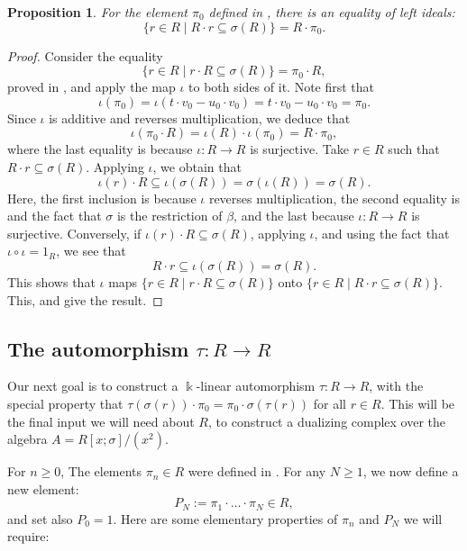 \documentclass{amsart}
\newtheorem{prop}[equation]{Proposition}
\theoremstyle{definition}
\renewcommand{\k}{\Bbbk}
\numberwithin{equation}{section}
\begin{document}
\begin{prop}\label{prop:rightcondComp}
For the element $\pi_0$ defined in ,
there is an equality of left ideals:
\[
\{r \in R \mid R\cdot r \subseteq \sigma(R)\} = R \cdot \pi_0.
\]
\end{prop}
\begin{proof}
Consider the equality
\begin{equation}\label{eqn:leftcondeq}
\{r \in R \mid r\cdot R \subseteq \sigma(R)\} = \pi_0 \cdot R,
\end{equation}
proved in ,
and apply the map $\iota$ to both sides of it.
Note first that 
\[
\iota(\pi_0) = \iota(t\cdot v_0 -u_0\cdot v_0) = 
t\cdot v_0 - u_0 \cdot v_0 = \pi_0.
\]
Since $\iota$ is additive and reverses multiplication,
we deduce that 
\begin{equation}\label{eqn:iotapileftright}
\iota(\pi_0 \cdot R) = \iota(R) \cdot \iota(\pi_0) = R\cdot \pi_0,
\end{equation}
where the last equality is because $\iota:R \to R$ is surjective.
Take $r \in R$ such that $R\cdot r \subseteq \sigma(R)$.
Applying $\iota$, we obtain that
\[
\iota(r) \cdot R \subseteq \iota(\sigma(R)) = \sigma(\iota(R)) = \sigma(R).
\]
Here, the first inclusion is because $\iota$ reverses multiplication,
the second equality is  and the fact that $\sigma$ is the restriction of $\beta$, and the last because $\iota:R \to R$ is surjective.
Conversely, if $\iota(r)\cdot R \subseteq \sigma(R)$,
applying $\iota$, and using the fact that $\iota\circ \iota = 1_R$,
we see that 
\[
R\cdot r \subseteq \iota(\sigma(R)) = \sigma(R).
\]
This shows that $\iota$ maps $\{r \in R \mid r\cdot R \subseteq \sigma(R)\}$ onto $\{r \in R \mid R\cdot r \subseteq \sigma(R)\}$. 
This,  and  give the result.
\end{proof}

\subsection{The automorphism $\tau:R \to R$}

Our next goal is to construct a $\k$-linear automorphism $\tau:R\to R$,
with the special property that $\tau(\sigma(r)) \cdot \pi_0 = \pi_0 \cdot \sigma(\tau(r))$ for all $r \in R$. This will be the final input we will need about $R$, to construct a dualizing complex over the algebra $A = R[x;\sigma]/(x^2)$.

For $n \ge 0$, The elements $\pi_n \in R$ were defined in .
For any $N \ge 1$, we now define a new element:
\begin{equation}\label{eqn:PN}
P_N := \pi_1 \cdot \dots \cdot \pi_N \in R,
\end{equation}
and set also $P_0 = 1$.
Here are some elementary properties of $\pi_n$ and $P_N$ we will require:
\end{document}
